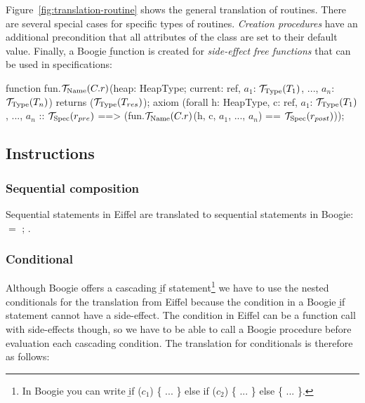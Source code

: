 Figure~\ref{fig:translation-routine} shows the general translation of routines. There are several special cases for specific types of routines. \emph{Creation procedures} have an additional precondition that all attributes of the class are set to their default value. Finally, a Boogie \b{function} is created for \emph{side-effect free functions} that can be used in specifications:
\begin{brunning}
function fun.$\ts{Name}{C.r}$(heap: HeapType; current: ref, 
		$a_1$: $\ts{Type}{T_1}$, ..., $a_n$: $\ts{Type}{T_n}$) returns ($\ts{Type}{T_{res}}$);
axiom (forall h: HeapType, c: ref, $a_1$: $\ts{Type}{T_1}$, ..., $a_n$ :: 
		$\ts{Spec}{r_{pre}}$ ==> (fun.$\ts{Name}{C.r}$(h, c, $a_1$, ..., $a_n$) == $\ts{Spec}{r_{post}}$));
\end{brunning}


\subsection{Instructions}


\subsubsection{Sequential composition}

Sequential statements in Eiffel are translated to sequential statements in Boogie: 
 $ = $ ; .

\subsubsection{Conditional}

Although Boogie offers a cascading \b{if} statement\footnote{In Boogie you can write \b{if ($c_1$) \{ ... \} else if ($c_2$) \{ ... \} else \{ ... \}}.} we have to use the nested conditionals for the translation from Eiffel because the condition in a Boogie \b{if} statement cannot have a side-effect. The  condition in Eiffel can be a function call with side-effects though, so we have to be able to call a Boogie procedure before evaluation each cascading condition. The translation for conditionals is therefore as follows:

